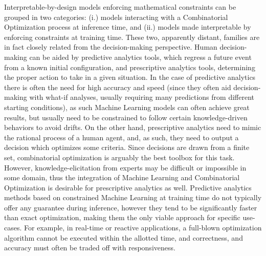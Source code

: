 Interpretable-by-design models enforcing mathematical constraints can be grouped in two categories: (i.) models interacting with a Combinatorial Optimization process at inference time, and (ii.) models made interpretable by enforcing constraints at training time.
These two, apparently distant, families are in fact closely related from the decision-making perspective.
Human decision-making can be aided by predictive analytics tools, which regress a future event from a known initial configuration, and prescriptive analytics tools, determining the proper action to take in a given situation.
%
In the case of predictive analytics there is often the need for high accuracy and speed (since they often aid decision-making with what-if analyses, usually requiring many predictions from different starting conditions), as such Machine Learning models can often achieve great results, but usually need to be constrained to follow certain knowledge-driven behaviors to avoid drifts.
On the other hand, prescriptive analytics need to mimic the rational process of a human agent, and, as such, they need to output a decision which optimizes some criteria. Since decisions are drawn from a finite set, combinatorial optimization is arguably the best toolbox for this task. However, knowledge-elicitation from experts may be difficult or impossible in some domain, thus the integration of Machine Learning and Combinatorial Optimization is desirable for prescriptive analytics as well.
%
Predictive analytics methods based on constrained Machine Learning at training time do not typically offer any guarantee during inference, however they tend to be significantly faster than exact optimization, making them the only viable approach for specific use-cases. %
For example, in real-time or reactive applications, a full-blown optimization algorithm cannot be executed within the allotted time, and correctness, and accuracy must often be traded off with responsiveness. 
